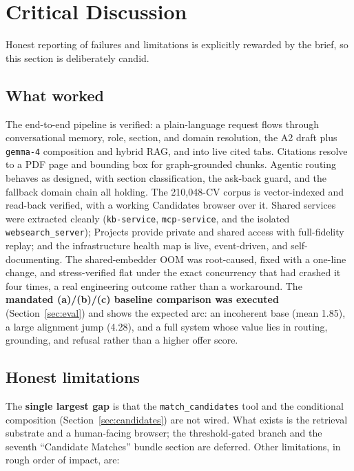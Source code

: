 \section{Critical Discussion}
\label{sec:discussion}

Honest reporting of failures and limitations is explicitly rewarded by the brief, so this
section is deliberately candid.

\subsection{What worked}

The end-to-end pipeline is verified: a plain-language request flows through conversational
memory, role, section, and domain resolution, the A2 draft plus \verb|gemma-4| composition
and hybrid RAG, and into live cited tabs. Citations resolve to a PDF page and bounding box
for graph-grounded chunks. Agentic routing behaves as designed, with section
classification, the ask-back guard, and the fallback domain chain all holding. The
210,048-CV corpus is vector-indexed and read-back verified, with a working Candidates
browser over it. Shared services were extracted cleanly (\verb|kb-service|,
\verb|mcp-service|, and the isolated \verb|websearch_server|); Projects provide private and
shared access with full-fidelity replay; and the infrastructure health map is live,
event-driven, and self-documenting. The shared-embedder OOM was root-caused, fixed with a
one-line change, and stress-verified flat under the exact concurrency that had crashed it
four times, a real engineering outcome rather than a workaround. The \textbf{mandated
(a)/(b)/(c) baseline comparison was executed} (Section~\ref{sec:eval}) and shows the expected
arc: an incoherent base (mean 1.85), a large alignment jump (4.28), and a full system whose
value lies in routing, grounding, and refusal rather than a higher offer score.

\subsection{Honest limitations}
\label{sec:limitations}

The \textbf{single largest gap} is that the \verb|match_candidates| tool and the
conditional composition (Section~\ref{sec:candidates}) are not wired. What exists is the
retrieval substrate and a human-facing browser; the threshold-gated branch and the seventh
``Candidate Matches'' bundle section are deferred. Other limitations, in rough order of
impact, are:

